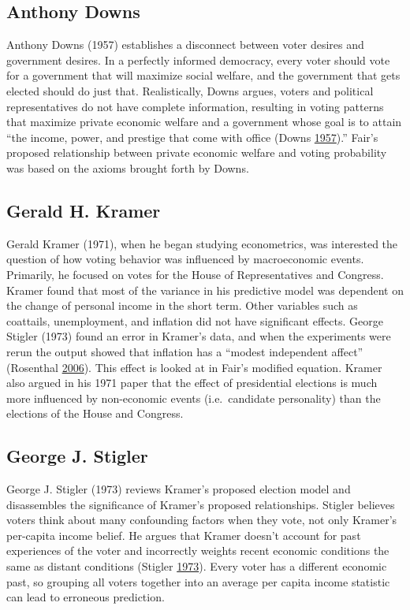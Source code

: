 \documentclass[11,]{article}
\begin{document}
\hypertarget{anthony-downs}{%
\subsection{Anthony Downs}\label{anthony-downs}}

Anthony Downs (1957) establishes a disconnect between voter desires and
government desires. In a perfectly informed democracy, every voter
should vote for a government that will maximize social welfare, and the
government that gets elected should do just that. Realistically, Downs
argues, voters and political representatives do not have complete
information, resulting in voting patterns that maximize private economic
welfare and a government whose goal is to attain ``the income, power,
and prestige that come with office (Downs
\protect\hyperlink{ref-downs_economic}{1957}).'' Fair's proposed
relationship between private economic welfare and voting probability was
based on the axioms brought forth by Downs.

\hypertarget{gerald-h.-kramer}{%
\subsection{Gerald H. Kramer}\label{gerald-h.-kramer}}

Gerald Kramer (1971), when he began studying econometrics, was
interested the question of how voting behavior was influenced by
macroeconomic events. Primarily, he focused on votes for the House of
Representatives and Congress. Kramer found that most of the variance in
his predictive model was dependent on the change of personal income in
the short term. Other variables such as coattails, unemployment, and
inflation did not have significant effects. George Stigler (1973) found
an error in Kramer's data, and when the experiments were rerun the
output showed that inflation has a ``modest independent affect''
(Rosenthal \protect\hyperlink{ref-rosenthal_gerald_2006}{2006}). This
effect is looked at in Fair's modified equation. Kramer also argued in
his 1971 paper that the effect of presidential elections is much more
influenced by non-economic events (i.e.~candidate personality) than the
elections of the House and Congress.

\hypertarget{george-j.-stigler}{%
\subsection{George J. Stigler}\label{george-j.-stigler}}

George J. Stigler (1973) reviews Kramer's proposed election model and
disassembles the significance of Kramer's proposed relationships.
Stigler believes voters think about many confounding factors when they
vote, not only Kramer's per-capita income belief. He argues that Kramer
doesn't account for past experiences of the voter and incorrectly
weights recent economic conditions the same as distant conditions
(Stigler \protect\hyperlink{ref-stigler_general_1973}{1973}). Every
voter has a different economic past, so grouping all voters together
into an average per capita income statistic can lead to erroneous
prediction.
\end{document}
